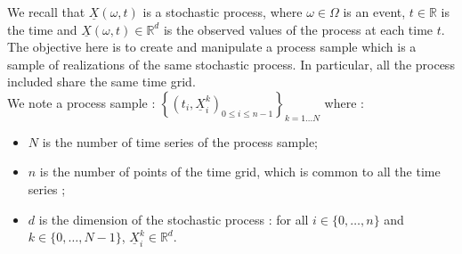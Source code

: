 \renewcommand{\filename}{docUC_ProcessSample.tex}
\renewcommand{\filetitle}{UC : Manipulation of a process sample}

\HeaderIILevel

\label{UCprocessSample}




We recall that  $\underline{X}(\omega,t)$ is a stochastic process, where $\omega \in \Omega$ is an event, $t \in \mathbb{R}$ is the time and $\underline{X}(\omega,t) \in \mathbb{R}^d$ is the observed values of the process at each time $t$.\\

The objective here is to create and manipulate a process sample which is a sample of realizations of the same stochastic process. In particular, all the process included share the same time grid.\\
We note a process sample : $\left\{(t_i, \underline{X}_i^k)_{0 \leq i \leq n-1} \right\}_{k=1 \hdots N}$ where :
\begin{itemize}
\item $N$ is the number of time series of the process sample;
\item $n$ is the number of points of the time grid, which is common to all the time series ;
\item $d$ is the dimension of the stochastic process : for all $i \in \{0,\dots,n\}$ and $k\in\{0,\dots,N-1\}$, $\underline{X}_i^k \in \mathbb{R}^d$.
\end{itemize}

